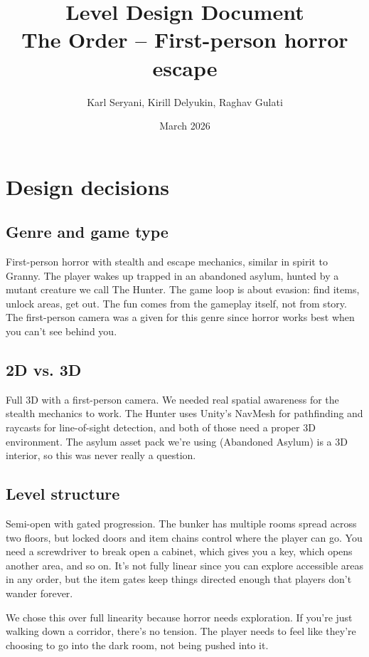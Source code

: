 \documentclass[12pt, a4paper]{article}
\title{\textbf{Level Design Document}\\[0.3em]\large The Order -- First-person horror escape}
\author{Karl Seryani, Kirill Delyukin, Raghav Gulati}
\date{March 2026}
\begin{document}
\maketitle

\section{Design decisions}

\subsection{Genre and game type}

First-person horror with stealth and escape mechanics, similar in spirit to Granny. The player wakes up trapped in an abandoned asylum, hunted by a mutant creature we call The Hunter. The game loop is about evasion: find items, unlock areas, get out. The fun comes from the gameplay itself, not from story. The first-person camera was a given for this genre since horror works best when you can't see behind you.

\subsection{2D vs. 3D}

Full 3D with a first-person camera. We needed real spatial awareness for the stealth mechanics to work. The Hunter uses Unity's NavMesh for pathfinding and raycasts for line-of-sight detection, and both of those need a proper 3D environment. The asylum asset pack we're using (Abandoned Asylum) is a 3D interior, so this was never really a question.

\subsection{Level structure}

Semi-open with gated progression. The bunker has multiple rooms spread across two floors, but locked doors and item chains control where the player can go. You need a screwdriver to break open a cabinet, which gives you a key, which opens another area, and so on. It's not fully linear since you can explore accessible areas in any order, but the item gates keep things directed enough that players don't wander forever.

We chose this over full linearity because horror needs exploration. If you're just walking down a corridor, there's no tension. The player needs to feel like they're choosing to go into the dark room, not being pushed into it.
\end{document}
